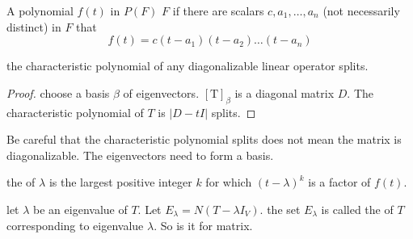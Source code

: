 \begin{definition}
    A polynomial $f(t)$ in $P(F)$  $F$ if there are scalars $c, a_1, \dots, a_n$ (not necessarily distinct) in $F$ that
    \begin{equation*}
        f(t) = c(t - a_1)(t - a_2) \dots (t-a_n)
    \end{equation*}
\end{definition}

\begin{theorem}
    the characteristic polynomial of any diagonalizable linear operator splits.
\end{theorem}

\begin{proof}
    choose a basis $\beta$ of eigenvectors. $[\mathrm{T}]_\beta$ is a diagonal matrix $D$. The characteristic polynomial of $T$ is $|D - tI|$ splits.
\end{proof}

Be careful that the characteristic polynomial splits does not mean the matrix is diagonalizable. The eigenvectors need to form a basis.

\begin{definition}
    the  of $\lambda$ is the largest positive integer $k$ for which $(t - \lambda)^k$ is a factor of $f(t)$.
\end{definition}

\begin{definition}
    let $\lambda$ be an eigenvalue of $T$. Let $E_\lambda = N(T - \lambda I_V)$. the set $E_\lambda$ is called the  of $T$ corresponding to eigenvalue $\lambda$. So is it for matrix.
\end{definition}

